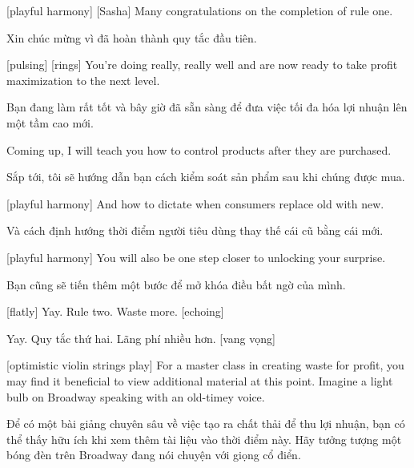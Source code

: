\documentclass[a4paper]{article}
\begin{document}
	[playful harmony]
	[Sasha] Many congratulations on the completion of rule one.
	
	\begin{vietnamese-v2}
		 Xin chúc mừng vì đã hoàn thành quy tắc đầu tiên.
	\end{vietnamese-v2}
	
	[pulsing]
	[rings]
	You're doing really, really well and are now ready to take profit maximization to the next level.
	
	\begin{vietnamese-v2}
		Bạn đang làm rất tốt và bây giờ đã sẵn sàng để đưa việc tối đa hóa lợi nhuận lên một tầm cao mới.
	\end{vietnamese-v2}
	
	Coming up, I will teach you how to control products after they are purchased.
	
	\begin{vietnamese-v2}
		Sắp tới, tôi sẽ hướng dẫn bạn cách kiểm soát sản phẩm sau khi chúng được mua.
	\end{vietnamese-v2}
	
	[playful harmony]
	And how to dictate when consumers replace old with new.
	
	\begin{vietnamese-v2}
		Và cách định hướng thời điểm người tiêu dùng thay thế cái cũ bằng cái mới.
	\end{vietnamese-v2}
	
	[playful harmony]
	You will also be one step closer to unlocking your surprise.
	
	\begin{vietnamese-v2}
		Bạn cũng sẽ tiến thêm một bước để mở khóa điều bất ngờ của mình.
	\end{vietnamese-v2}
	
	
	[flatly] Yay.
	Rule two.
	Waste more. [echoing]
	
	\begin{vietnamese-v2}
		 Yay. 
		Quy tắc thứ hai. 
		Lãng phí nhiều hơn. [vang vọng]
	\end{vietnamese-v2}
	
	[optimistic violin strings play]
	For a master class in creating waste for profit, you may find it beneficial to view additional material at this point.
	Imagine a light bulb on Broadway speaking with an old-timey voice.
	
	\begin{vietnamese-v2}
		Để có một bài giảng chuyên sâu về việc tạo ra chất thải để thu lợi nhuận, bạn có thể thấy hữu ích khi xem thêm tài liệu vào thời điểm này. 
		Hãy tưởng tượng một bóng đèn trên Broadway đang nói chuyện với giọng cổ điển.
	\end{vietnamese-v2}
	
\end{document}
